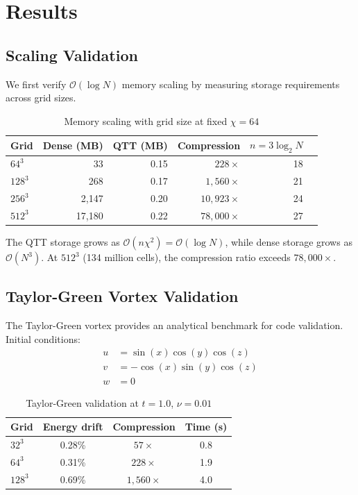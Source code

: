 \documentclass[11pt,a4paper]{article}
\newcommand{\bigO}{\mathcal{O}}
\theoremstyle{definition}
\begin{document}
\section{Results}
\label{sec:results}

\subsection{Scaling Validation}

We first verify $\bigO(\log N)$ memory scaling by measuring storage requirements across grid sizes.

\begin{table}[htbp]
\centering
\caption{Memory scaling with grid size at fixed $\chi = 64$}
\label{tab:scaling}
\begin{tabular}{lrrrrr}
\toprule
Grid & Dense (MB) & QTT (MB) & Compression & $n = 3\log_2 N$ \\
\midrule
$64^3$ & 33 & 0.15 & $228\times$ & 18 \\
$128^3$ & 268 & 0.17 & $1{,}560\times$ & 21 \\
$256^3$ & 2,147 & 0.20 & $10{,}923\times$ & 24 \\
$512^3$ & 17,180 & 0.22 & $78{,}000\times$ & 27 \\
\bottomrule
\end{tabular}
\end{table}

The QTT storage grows as $\bigO(n\chi^2) = \bigO(\log N)$, while dense storage grows as $\bigO(N^3)$.
At $512^3$ (134 million cells), the compression ratio exceeds $78{,}000\times$.

\subsection{Taylor-Green Vortex Validation}

The Taylor-Green vortex provides an analytical benchmark for code validation.
Initial conditions:
\begin{align}
u &= \sin(x)\cos(y)\cos(z) \\
v &= -\cos(x)\sin(y)\cos(z) \\
w &= 0
\end{align}

\begin{table}[htbp]
\centering
\caption{Taylor-Green validation at $t = 1.0$, $\nu = 0.01$}
\label{tab:taylor_green}
\begin{tabular}{lccc}
\toprule
Grid & Energy drift & Compression & Time (s) \\
\midrule
$32^3$ & 0.28\% & $57\times$ & 0.8 \\
$64^3$ & 0.31\% & $228\times$ & 1.9 \\
$128^3$ & 0.69\% & $1{,}560\times$ & 4.0 \\
\bottomrule
\end{tabular}
\end{table}
\end{document}
